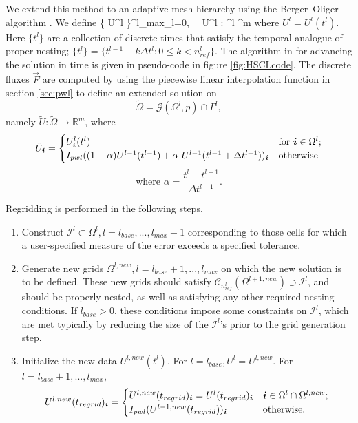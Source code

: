 We extend this method to an adaptive mesh hierarchy using the
Berger--Oliger algorithm \cite{bergerOliger:1984}.  We define
\beqa
\{ U^l \}^{l_{max}}_{l=0}, \ \
U^l : \Omega^l ^m
\eeqa
where $U^l = U^l(t^l)$.  Here $\{ t^l \}$ are a collection of discrete times
that satisfy the temporal analogue of proper nesting;  $ \{ t^l \} =
\{ t^{l-1} + k \Delta t^l : 0 \leq k < n^l_{ref} \}$.  The
algorithm in \cite{bergerColella:1989} 
for advancing the solution in time is given in
pseudo-code in figure \ref{fig:HSCLcode}.
The discrete fluxes $\vec{F}$ are computed
by using the piecewise linear interpolation function in
section \ref{sec:pwl} to define
an extended solution on 
\begin{equation*}
\tilde{\Omega} = {\mathcal{G}}(\Omega^l, p) \cap \Gamma^l ,
\end{equation*}
namely
$\tilde{U} : \tilde{\Omega} \rightarrow {\mathbb{R}}^m$,
where
\begin{equation*}
\tilde{U}_{{\boldsymbol{i}}} = 
  \begin{cases}
    U^l_{\boldsymbol{i}} (t^l) &
      \text{for ${\boldsymbol{i}} \in \Omega^l$;}
    \\ 
    I_{pwl} ((1 - \alpha)  U^{l-1}(t^{l-1}                 ) +
                  \alpha ~ U^{l-1}(t^{l-1} + \Delta t^{l-1}))_{\boldsymbol{i}} &
      \text{otherwise}
  \end{cases}
\end{equation*}
\begin{equation*}
\text{where \ \ } \alpha = \frac{t^l - t^{l-1}}{\Delta t^{l-1}} .
\end{equation*}

Regridding is performed in the following steps.
\begin{enumerate}
\item
Construct ${\mathcal{I}}^l \subset \Omega^l, l = l_{base}, ..., l_{max} -1$
corresponding to those cells for which a user-specified  measure of
the error exceeds a specified tolerance.
\item
Generate new
grids $\Omega^{l, new}, l = l_{base} +1, ..., l_{max}$ on which the
new solution is to be defined.  These new grids should satisfy
${\mathcal{C}}_{n^l_{ref}}(\Omega^{l+1, new}) \supset {\mathcal{I}}^l$, and should
be properly nested, as well as satisfying any other required nesting
conditions.  
If $l_{base} > 0$,
these conditions impose some constraints on ${\mathcal{I}}^l$,
which are met typically by reducing
the size of the ${\mathcal{I}}^l$'s prior to the grid generation step.
\item
Initialize the new data $U^{l, new} (t^l)$.  For $l = l_{base} ,
U^l = U^{l, new}$.
For $l = l_{base} +1, ..., l_{max}$,
\begin{equation*}
U^{l, new} (t_{regrid})_{\boldsymbol{i}} =
  \begin{cases}
    U^{l, new} (t_{regrid})_{\boldsymbol{i}} = U^l(t_{regrid})_{\boldsymbol{i}} &
      {\boldsymbol{i}} \in \Omega^l \cap \Omega^{l, new} ;
    \\
    I_{pwl} (U^{l-1, new} (t_{regrid}))_{\boldsymbol{i}} &
      \text{otherwise.}
  \end{cases}
\end{equation*}
\end{enumerate}

